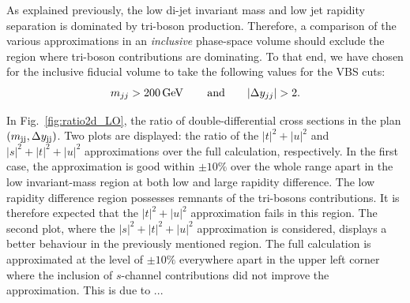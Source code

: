As explained previously, the low di-jet invariant mass and low jet rapidity separation is dominated by tri-boson production.
Therefore, a comparison of the various approximations in an \emph{inclusive} phase-space volume should exclude the region where tri-boson contributions are dominating.
To that end, we have chosen for the inclusive fiducial volume to take the following values for the VBS cuts:
%
\begin{equation}
\label{eq:inclusive}
	m_{jj} > 200\,\text{GeV}\, \qquad {\rm and} \qquad |\Delta y_{jj}| > 2 .
\end{equation}

In Fig.~\ref{fig:ratio2d_LO}, the ratio of double-differential cross sections in the plan $\left(m_{\text{j}\text{j}}, \Delta y_{\text{j}\text{j}}\right)$.
Two plots are displayed: the ratio of the $|t|^2 + |u|^2$ and $|s|^2 + |t|^2 + |u|^2$ approximations over the full calculation, respectively.
In the first case, the approximation is good within $\pm10\%$ over the whole range apart in the low invariant-mass region at both low and large rapidity difference.
The low rapidity difference region possesses remnants of the tri-bosons contributions.
It is therefore expected that the $|t|^2 + |u|^2$ approximation fails in this region.
The second plot, where the $|s|^2 + |t|^2 + |u|^2$ approximation is considered, displays a better behaviour in the previously mentioned region.
The full calculation is approximated at the level of $\pm10\%$ everywhere apart in the upper left corner where the inclusion of $s$-channel contributions did not improve the approximation.
This is due to ... 

